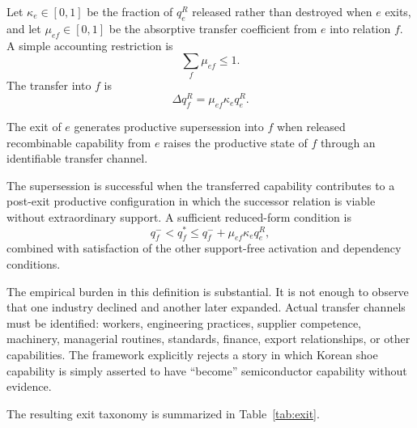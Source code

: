 Let $\kappa_e\in[0,1]$ be the fraction of $q_e^R$ released rather than destroyed when $e$ exits, and let $\mu_{ef}\in[0,1]$ be the absorptive transfer coefficient from $e$ into relation $f$. A simple accounting restriction is
\begin{equation}
\sum_f\mu_{ef}\le1.
\end{equation}
The transfer into $f$ is
\begin{equation}
\Delta q_f^R
=
\mu_{ef}\kappa_e q_e^R.
\label{eq:transfer}
\end{equation}

\begin{definition}
The exit of $e$ generates productive supersession into $f$ when released recombinable capability from $e$ raises the productive state of $f$ through an identifiable transfer channel.
\end{definition}

\begin{definition}
The supersession is successful when the transferred capability contributes to a post-exit productive configuration in which the successor relation is viable without extraordinary support. A sufficient reduced-form condition is
\begin{equation}
q_f^-<q_f^*
\le
q_f^-+\mu_{ef}\kappa_e q_e^R,
\label{eq:supersession-condition}
\end{equation}
combined with satisfaction of the other support-free activation and dependency conditions.
\end{definition}

The empirical burden in this definition is substantial. It is not enough to observe that one industry declined and another later expanded. Actual transfer channels must be identified: workers, engineering practices, supplier competence, machinery, managerial routines, standards, finance, export relationships, or other capabilities. The framework explicitly rejects a story in which Korean shoe capability is simply asserted to have ``become'' semiconductor capability without evidence.

The resulting exit taxonomy is summarized in Table~\ref{tab:exit}.

